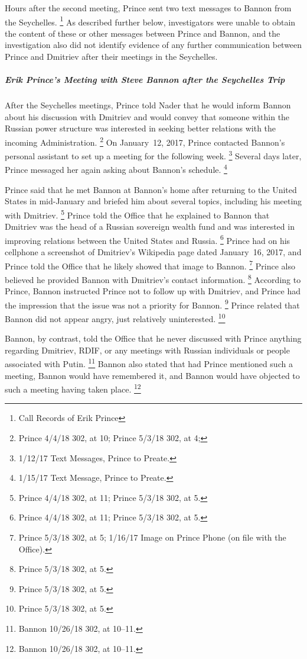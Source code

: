 Hours after the second meeting, Prince sent two text messages to Bannon from the Seychelles.%
\footnote{Call Records of Erik Prince }
As described further below, investigators were unable to obtain the content of these or other messages between Prince and Bannon, and the investigation also did not identify evidence of any further communication between Prince and Dmitriev after their meetings in the Seychelles.

\subparagraph{Erik Prince's Meeting with Steve Bannon after the Seychelles Trip}

After the Seychelles meetings, Prince told Nader that he would inform Bannon about his discussion with Dmitriev and would convey that someone within the Russian power structure was interested in seeking better relations with the incoming Administration.%
\footnote{Prince 4/4/18 302, at 10;
Prince 5/3/18 302, at 4;
}
On January~12, 2017, Prince contacted Bannon's personal assistant to set up a meeting for the following week.%
\footnote{1/12/17 Text Messages, Prince to Preate.}
Several days later, Prince messaged her again asking about Bannon's schedule.%
\footnote{1/15/17 Text Message, Prince to Preate.}

Prince said that he met Bannon at Bannon's home after returning to the United States in mid-January and briefed him about several topics, including his meeting with Dmitriev.%
\footnote{Prince 4/4/18 302, at 11;
Prince 5/3/18 302, at 5.}
Prince told the Office that he explained to Bannon that Dmitriev was the head of a Russian sovereign wealth fund and was interested in improving relations between the United States and Russia.%
\footnote{Prince 4/4/18 302, at 11;
Prince 5/3/18 302, at 5.}
Prince had on his cellphone a screenshot of Dmitriev's Wikipedia page dated January~16, 2017, and Prince told the Office that he likely showed that image to Bannon.%
\footnote{Prince 5/3/18 302, at 5;
1/16/17 Image on Prince Phone (on file with the Office).}
Prince also believed he provided Bannon with Dmitriev's contact information.%
\footnote{Prince 5/3/18 302, at 5.}
According to Prince, Bannon instructed Prince not to follow up with Dmitriev, and Prince had the impression that the issue was not a priority for Bannon.%
\footnote{Prince 5/3/18 302, at 5.}
Prince related that Bannon did not appear angry, just relatively uninterested.%
\footnote{Prince 5/3/18 302, at 5.}

Bannon, by contrast, told the Office that he never discussed with Prince anything regarding Dmitriev, RDIF, or any meetings with Russian individuals or people associated with Putin.%
\footnote{Bannon 10/26/18 302, at 10--11.}
Bannon also stated that had Prince mentioned such a meeting, Bannon would have remembered it, and Bannon would have objected to such a meeting having taken place.%
\footnote{Bannon 10/26/18 302, at 10--11.}

